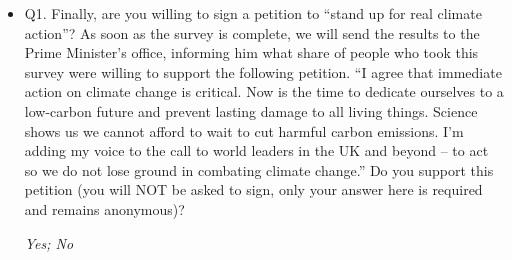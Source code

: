 \documentclass{article}
\begin{document}
\begin{itemize}
    \item Q1. Finally, are you willing to sign a petition to ``stand up for real climate action''?
    As soon as the survey is complete, we will send the results to the Prime Minister's office, informing him what share of people who took this survey were willing to support the following petition. 
    ``I agree that immediate action on climate change is critical. Now is the time to dedicate ourselves to a low-carbon future and prevent lasting damage to all living things. Science shows us we cannot afford to wait to cut harmful carbon emissions. I'm adding my voice to the call to world leaders in the UK and beyond -- to act so we do not lose ground in combating climate change.''
    Do you support this petition (you will NOT be asked to sign, only your answer here is required and remains anonymous)? 

    \textit{Yes; No}
\end{itemize}
\end{document}
